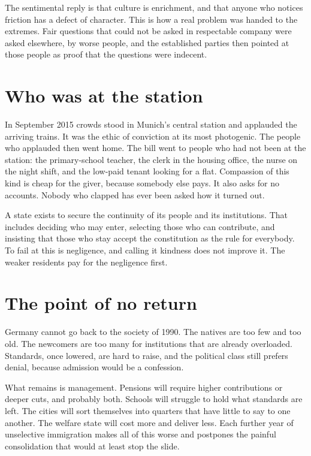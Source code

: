 \documentclass[12pt,a4paper]{book}
\begin{document}
The sentimental reply is that culture is enrichment, and that anyone who notices friction has a defect of character. This is how a real problem was handed to the extremes. Fair questions that could not be asked in respectable company were asked elsewhere, by worse people, and the established parties then pointed at those people as proof that the questions were indecent.

\section{Who was at the station}

In September 2015 crowds stood in Munich's central station and applauded the arriving trains. It was the ethic of conviction at its most photogenic. The people who applauded then went home. The bill went to people who had not been at the station: the primary-school teacher, the clerk in the housing office, the nurse on the night shift, and the low-paid tenant looking for a flat. Compassion of this kind is cheap for the giver, because somebody else pays. It also asks for no accounts. Nobody who clapped has ever been asked how it turned out.

A state exists to secure the continuity of its people and its institutions. That includes deciding who may enter, selecting those who can contribute, and insisting that those who stay accept the constitution as the rule for everybody. To fail at this is negligence, and calling it kindness does not improve it. The weaker residents pay for the negligence first.

\section{The point of no return}

Germany cannot go back to the society of 1990. The natives are too few and too old. The newcomers are too many for institutions that are already overloaded. Standards, once lowered, are hard to raise, and the political class still prefers denial, because admission would be a confession.

What remains is management. Pensions will require higher contributions or deeper cuts, and probably both. Schools will struggle to hold what standards are left. The cities will sort themselves into quarters that have little to say to one another. The welfare state will cost more and deliver less. Each further year of unselective immigration makes all of this worse and postpones the painful consolidation that would at least stop the slide.
\end{document}
